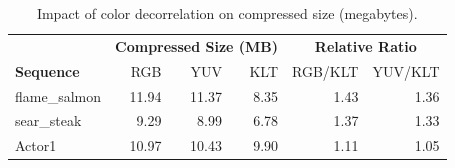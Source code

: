 \begin{table}[t]
  \centering
  \footnotesize
  \caption{RAHT decode latency on Jetson Orin (ms). CUDA vs.\ PyTorch implementation. Averaged across sampled frames.}
  \label{tab:jetson-raht-decode}
\end{table}

\begin{table}[b]
  \centering
  \footnotesize
  \begin{tabular}{l|rrr|rr}
    \hline
    & \multicolumn{3}{c|}{\textbf{Compressed Size (MB)}} & \multicolumn{2}{c}{\textbf{Relative Ratio}} \\
    \textbf{Sequence} & RGB & YUV & KLT & RGB/KLT & YUV/KLT \\
    \hline\hline
    flame\_salmon  & 11.94 & 11.37  & 8.35  & 1.43  & 1.36  \\
    sear\_steak    & 9.29 & 8.99  & 6.78    & 1.37  & 1.33  \\
    Actor1         & 10.97 & 10.43  & 9.90  & 1.11  & 1.05  \\
    \hline
  \end{tabular}
  \caption{Impact of color decorrelation on compressed size (megabytes).}
  \label{tab:ablation-klt}
\end{table}